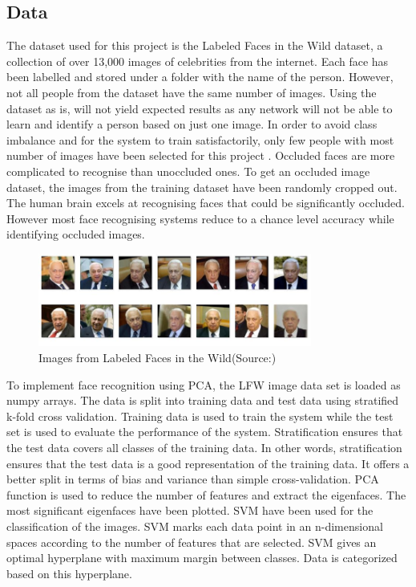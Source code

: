 \documentclass[conference]{IEEEtran}
\begin{document}
\subsection{Data} 
\label{subsec: 4a. Data}
The dataset used for this project is the Labeled Faces in the Wild dataset, a collection of over 13,000 images of celebrities from the internet. Each face has been labelled and stored under a folder with the name of the person. However, not all people from the dataset have the same number of images. Using the dataset as is, will not yield expected results as any network will not be able to learn and identify a person based on just one image. In order to avoid class imbalance and for the system to train satisfactorily, only few people with most number of images have been selected for this project \cite{LFWTech}. Occluded faces are more complicated to recognise than unoccluded ones. To get an occluded image dataset, the images from the training dataset have been randomly cropped out. The human brain excels at recognising faces that could be significantly occluded. However most face recognising systems reduce to a chance level accuracy while identifying occluded images.

\begin{figure}[h!]
 \centering
 \includegraphics[width = 9cm]{dataset.JPG}
  \caption{ Images from Labeled Faces in the Wild(Source:\cite{LFWTech})}
 \label{fig : dataset}
\end{figure}

To implement face recognition using PCA, the LFW image data set is loaded as numpy arrays. The data is split into training data and test data using stratified k-fold cross validation. Training data is used to train the system while the test set is used to evaluate the performance of the system. Stratification ensures that the test data covers all classes of the training data. In other words, stratification ensures that the test data is a good representation of the training data. It offers a better split in terms of bias and variance than simple cross-validation. PCA function is used to reduce the number of features and extract the eigenfaces. The most significant eigenfaces have been plotted. SVM have been used for the classification of the images. SVM marks each data point in an n-dimensional spaces according to the number of features that are selected. SVM gives an optimal hyperplane with maximum margin between classes. Data is categorized based on this hyperplane.
\end{document}
